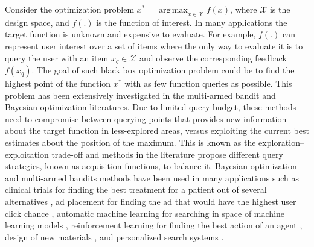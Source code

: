\documentclass[dissertation,math,vertlayout,pdfa,colorlinks]{aaltoseries}
\DeclareMathOperator*{\argmax}{arg\,max}
\begin{document}
Consider the optimization problem $x^* = \argmax_{x \in \mathcal{X}} f(x)$, where $\mathcal{X}$ is the design space, and $f(.)$ is the function of interest. In many applications the target function is unknown and expensive to evaluate. For example, $f(.)$ can represent user interest over a set of items where the only way to evaluate it is to query the user with an item $x_q \in \mathcal{X}$ and observe the corresponding feedback $f(x_q)$. The goal of such black box optimization problem could be to find the highest point of the function $x^*$ with as few function queries as possible. This problem has been extensively investigated in the multi-armed bandit \cite{bubeck2012regret} and Bayesian optimization \cite{brochu2010tutorial,BO_review} literatures. Due to limited query budget, these methods need to compromise between querying points that provides new information about the target function in less-explored areas, versus exploiting the current best estimates about the position of the maximum. 
This is known as the exploration--exploitation trade-off and methods in the literature propose different query strategies, known as acquisition functions, to balance it. Bayesian optimization and multi-armed bandits methods have been used in many applications such as clinical trials for finding the best treatment for a patient out of several alternatives \cite{bubeck2012regret}, ad placement for finding the ad that would have the highest user click chance \cite{Bandit_IR}, automatic machine learning for searching in space of machine learning models \cite{hoffman2014correlation}, reinforcement learning for finding the best action of an agent \cite{brochu2010tutorial}, design of new materials \cite{frazier2016bayesian,BOSS2019}, and personalized search systems \cite{ruotsalo2015interactive}. 
\end{document}
